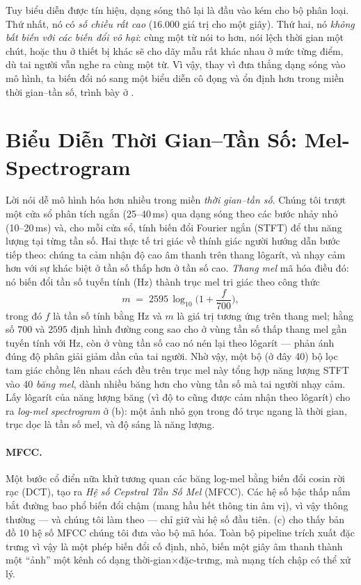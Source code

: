 \documentclass[12pt,a4paper]{report}
\begin{document}
Tuy biểu diễn được tín hiệu, dạng sóng thô lại là đầu vào kém cho bộ phân loại.
Thứ nhất, nó có \emph{số chiều rất cao} ($16{.}000$ giá trị cho một giây). Thứ
hai, nó \emph{không bất biến với các biến đổi vô hại}: cùng một từ nói to hơn,
nói lệch thời gian một chút, hoặc thu ở thiết bị khác sẽ cho dãy mẫu rất khác nhau
ở mức từng điểm, dù tai người vẫn nghe ra cùng một từ. Vì vậy, thay vì đưa thẳng
dạng sóng vào mô hình, ta biến đổi nó sang một biểu diễn cô đọng và ổn định hơn
trong miền thời gian--tần số, trình bày ở .

\section{Biểu Diễn Thời Gian--Tần Số: Mel-Spectrogram}\label{sec:mel}

Lời nói dễ mô hình hóa hơn nhiều trong miền \emph{thời gian--tần số}. Chúng tôi
trượt một cửa sổ phân tích ngắn (25--40\,ms) qua dạng sóng theo các bước nhảy nhỏ
(10--20\,ms) và, cho mỗi cửa sổ, tính biến đổi Fourier ngắn (STFT) để thu năng
lượng tại từng tần số. Hai thực tế tri giác về thính giác người hướng dẫn bước
tiếp theo: chúng ta cảm nhận độ cao âm thanh trên thang lôgarít, và nhạy cảm hơn
với sự khác biệt ở tần số thấp hơn ở tần số cao. \emph{Thang mel} mã hóa điều đó:
nó biến đổi tần số tuyến tính (Hz) thành trục mel tri giác theo công thức
\begin{equation}
m \;=\; 2595\,\log_{10}\!\Big(1+\frac{f}{700}\Big),
\label{eq:mel}
\end{equation}
trong đó $f$ là tần số tính bằng Hz và $m$ là giá trị tương ứng trên thang mel;
hằng số $700$ và $2595$ định hình đường cong sao cho ở vùng tần số thấp thang mel
gần tuyến tính với Hz, còn ở vùng tần số cao nó nén lại theo lôgarít --- phản ánh
đúng độ phân giải giảm dần của tai người. Nhờ vậy, một bộ (ở đây 40) bộ lọc tam
giác chồng lên nhau cách đều trên trục mel này tổng hợp năng lượng STFT vào 40
\emph{băng mel}, dành nhiều băng hơn cho vùng tần số mà tai người nhạy cảm. Lấy lôgarít của năng lượng băng
(vì độ to cũng được cảm nhận theo lôgarít) cho ra \emph{log-mel spectrogram} ở
(b): một ảnh nhỏ gọn trong đó trục ngang là thời gian, trục
dọc là tần số mel, và độ sáng là năng lượng.

\paragraph{MFCC.}
Một bước cổ điển nữa khử tương quan các băng log-mel bằng biến đổi cosin rời rạc
(DCT), tạo ra \emph{Hệ số Cepstral Tần Số Mel} (MFCC). Các hệ số bậc thấp nắm
bắt đường bao phổ biến đổi chậm (mang hầu hết thông tin âm vị), vì vậy thông
thường --- và chúng tôi làm theo --- chỉ giữ vài hệ số đầu tiên.
(c) cho thấy bản đồ 10 hệ số MFCC chúng tôi đưa vào bộ mã
hóa. Toàn bộ pipeline trích xuất đặc trưng vì vậy là một phép biến đổi cố định,
nhỏ, biến một giây âm thanh thành một ``ảnh'' một kênh có dạng
thời-gian$\times$đặc-trưng, mà mạng tích chập có thể xử lý.
\end{document}
